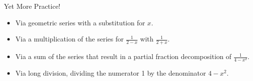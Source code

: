 \begin{exercise}{Yet More Practice! \Coffeecup \Coffeecup \Coffeecup}
\begin{itemize}
\begin{itemize}
\vspace*{2in}

\item Via geometric series with a substitution for $x$.  

\vspace*{2in}

\item Via a multiplication of the series for $\frac{1}{2-x}$ with 
$\frac{1}{2+x}$.

\vspace*{2in}

\item Via a sum of the series that result in a partial fraction decomposition of $\frac{1}{4-x^2}$.

\vspace*{2in}

\item Via long division, dividing the numerator 1 by the denominator $4-x^2$.

\vspace*{2in}

\end{itemize}
\end{itemize}
\end{exercise}
